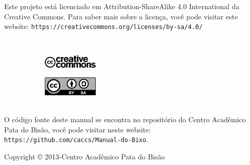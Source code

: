 \begin{center}
  Este projeto está licenciado em Attribution-ShareAlike 4.0 International da Creative Commons. Para saber mais sobre a licença, você pode visitar este website: \texttt{https://creativecommons.org/licenses/by-sa/4.0/}

  \\[0.5in]

  \begin{figure}[h]
    \centering
    \begin{subfigure}
      \centering
      \includegraphics[width=100]{./imagem/cc_logo.pdf}
    \end{subfigure}
    \begin{subfigure}
      \centering
      \includegraphics[width=100]{./imagem/by_sa.pdf}
    \end{subfigure}
  \end{figure}

  \\[0.5in]

  O código fonte deste manual se encontra no repositório do Centro Acadêmico Pata do Bisão, você pode visitar neste website: \texttt{https://github.com/caccs/Manual-do-Bixo}.


  \vfill Copyright © 2013-\the\year Centro Acadêmico Pata do Bisão
\end{center}
